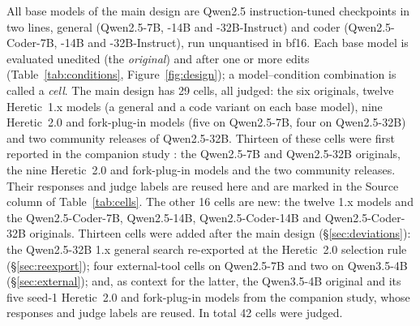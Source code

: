 All base models of the main design are Qwen2.5 instruction-tuned checkpoints \cite{qwen2024qwen25,hui2024qwen25coder}
in two lines, general (Qwen2.5-7B, -14B and -32B-Instruct) and coder (Qwen2.5-Coder-7B, -14B and -32B-Instruct), run
unquantised in bf16. Each base model is evaluated unedited (the \emph{original}) and after one or more edits
(Table~\ref{tab:conditions}, Figure~\ref{fig:design}); a model--condition combination is called a \emph{cell}. The main design has 29 cells,
all judged: the six originals, twelve Heretic~1.x models (a general and a code variant on each base model), nine
Heretic~2.0 and fork-plug-in models (five on Qwen2.5-7B, four on Qwen2.5-32B) and two community releases of
Qwen2.5-32B. Thirteen of these cells were first reported in the companion study \cite{young2026harder}: the
Qwen2.5-7B and Qwen2.5-32B originals, the nine Heretic~2.0 and fork-plug-in models and the two community releases.
Their responses and judge labels are reused here and are marked in the Source column of Table~\ref{tab:cells}. The
other 16 cells are new: the twelve 1.x models and the Qwen2.5-Coder-7B, Qwen2.5-14B, Qwen2.5-Coder-14B and
Qwen2.5-Coder-32B originals. Thirteen cells were added after the main design (\S\ref{sec:deviations}): the
Qwen2.5-32B 1.x general search re-exported at the Heretic~2.0 selection rule (\S\ref{sec:reexport}); four
external-tool cells on Qwen2.5-7B and two on Qwen3.5-4B (\S\ref{sec:external}); and, as context for the latter, the
Qwen3.5-4B original and its five seed-1 Heretic~2.0 and fork-plug-in models from the companion study, whose
responses and judge labels are reused. In total 42 cells were judged.

